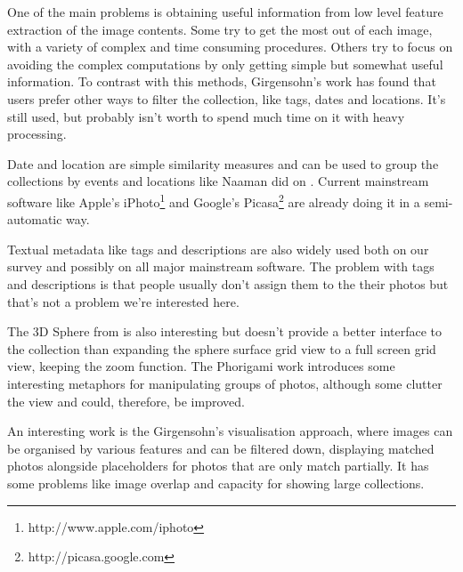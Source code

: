 One of the main problems is obtaining useful information from low level feature extraction of the image contents. Some try to get the most out of each image, with a variety of complex and time consuming procedures. Others try to focus on avoiding the complex computations by only getting simple but somewhat useful information. To contrast with this methods, Girgensohn's work \cite{Girgensohn:2010} has found that users prefer other ways to filter the collection, like tags, dates and locations. It's still used, but probably isn't worth to spend much time on it with heavy processing.

Date and location are simple similarity measures and can be used to group the collections by events and locations like Naaman did on \cite{Naaman:2004p1802}. Current mainstream software like Apple's iPhoto\footnote{http://www.apple.com/iphoto} and Google's Picasa\footnote{http://picasa.google.com} are already doing it in a semi-automatic way.

Textual metadata like tags and descriptions are also widely used both on our survey and possibly on all major mainstream software. The problem with tags and descriptions is that people usually don't assign them to the their photos but that's not a problem we're interested here.

The 3D Sphere from \cite{Schaefer:2010p1871} is also interesting but doesn't provide a better interface to the collection than expanding the sphere surface grid view to a full screen grid view, keeping the zoom function. The Phorigami work \cite{Hsu:2009p2696} introduces some interesting metaphors for manipulating groups of photos, although some clutter the view and could, therefore, be improved.

An interesting work is the Girgensohn's \cite{Girgensohn:2010} visualisation approach, where images can be organised by various features and can be filtered down, displaying matched photos alongside placeholders for photos that are only match partially. It has some problems like image overlap and capacity for showing large collections.

